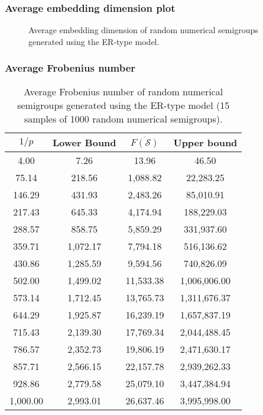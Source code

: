 \documentclass{beamer}
\begin{document}
\begin{frame}
    \frametitle{Average embedding dimension plot}
    \begin{figure}[h]
        \begin{center}
            \scalebox{0.6}{}
        \end{center}
        \caption{Average embedding dimension of random numerical semigroups generated using the ER-type model.}
        \label{fig:embedding}
    \end{figure}
\end{frame}


\begin{frame}
    \fontsize{10pt}{7.2}\selectfont
    \frametitle{Average Frobenius number}
    \begin{table}
        \centering
        \begin{tabular}{|c|c|c|c|}
            \hline
            $1/p$ & Lower Bound & $\overline{F(\mathcal{S})}$ & Upper bound \\
            \hline
            4.00 & 7.26 & 13.96 & 46.50 \\
            75.14 & 218.56 & 1,088.82 & 22,283.25 \\
            146.29 & 431.93 & 2,483.26 & 85,010.91 \\
            217.43 & 645.33 & 4,174.94 & 188,229.03 \\
            288.57 & 858.75 & 5,859.29 & 331,937.60 \\
            359.71 & 1,072.17 & 7,794.18 & 516,136.62 \\
            430.86 & 1,285.59 & 9,594.56 & 740,826.09 \\
            502.00 & 1,499.02 & 11,533.38 & 1,006,006.00 \\
            573.14 & 1,712.45 & 13,765.73 & 1,311,676.37 \\
            644.29 & 1,925.87 & 16,239.19 & 1,657,837.19 \\
            715.43 & 2,139.30 & 17,769.34 & 2,044,488.45 \\
            786.57 & 2,352.73 & 19,806.19 & 2,471,630.17 \\
            857.71 & 2,566.15 & 22,157.78 & 2,939,262.33 \\
            928.86 & 2,779.58 & 25,079.10 & 3,447,384.94 \\
            1,000.00 & 2,993.01 & 26,637.46 & 3,995,998.00 \\
            \hline
        \end{tabular}
        \caption{Average Frobenius number of random numerical semigroups generated using the ER-type model (15 samples of 1000 random numerical semigroups).}
        \label{tab:frobenius}
        \end{table}
    \end{frame}
\end{document}
